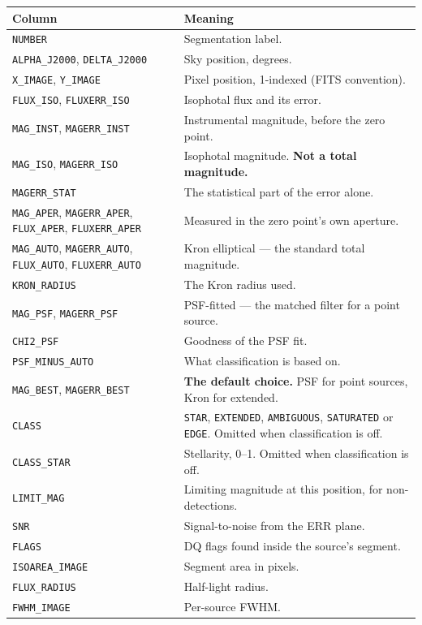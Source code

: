 \documentclass[11pt,a4paper]{article}
\begin{document}
\begin{center}
\begin{longtable}{|p{4.4cm}|p{10.1cm}|}
\hline
\textbf{Column} & \textbf{Meaning} \\
\hline
\endhead
\texttt{NUMBER} & Segmentation label. \\
\hline
\texttt{ALPHA\_J2000}, \texttt{DELTA\_J2000} & Sky position, degrees. \\
\hline
\texttt{X\_IMAGE}, \texttt{Y\_IMAGE} & Pixel position, 1-indexed (FITS convention). \\
\hline
\texttt{FLUX\_ISO}, \texttt{FLUXERR\_ISO} & Isophotal flux and its error. \\
\hline
\texttt{MAG\_INST}, \texttt{MAGERR\_INST} & Instrumental magnitude, before the zero point. \\
\hline
\texttt{MAG\_ISO}, \texttt{MAGERR\_ISO} & Isophotal magnitude. \textbf{Not a total magnitude.} \\
\hline
\texttt{MAGERR\_STAT} & The statistical part of the error alone. \\
\hline
\texttt{MAG\_APER}, \texttt{MAGERR\_APER}, \texttt{FLUX\_APER}, \texttt{FLUXERR\_APER} & Measured in the zero point's own aperture. \\
\hline
\texttt{MAG\_AUTO}, \texttt{MAGERR\_AUTO}, \texttt{FLUX\_AUTO}, \texttt{FLUXERR\_AUTO} & Kron elliptical --- the standard total magnitude. \\
\hline
\texttt{KRON\_RADIUS} & The Kron radius used. \\
\hline
\texttt{MAG\_PSF}, \texttt{MAGERR\_PSF} & PSF-fitted --- the matched filter for a point source. \\
\hline
\texttt{CHI2\_PSF} & Goodness of the PSF fit. \\
\hline
\texttt{PSF\_MINUS\_AUTO} & What classification is based on. \\
\hline
\texttt{MAG\_BEST}, \texttt{MAGERR\_BEST} & \textbf{The default choice.} PSF for point sources, Kron for extended. \\
\hline
\texttt{CLASS} & \texttt{STAR}, \texttt{EXTENDED}, \texttt{AMBIGUOUS}, \texttt{SATURATED} or \texttt{EDGE}. Omitted when classification is off. \\
\hline
\texttt{CLASS\_STAR} & Stellarity, 0--1. Omitted when classification is off. \\
\hline
\texttt{LIMIT\_MAG} & Limiting magnitude at this position, for non-detections. \\
\hline
\texttt{SNR} & Signal-to-noise from the ERR plane. \\
\hline
\texttt{FLAGS} & DQ flags found inside the source's segment. \\
\hline
\texttt{ISOAREA\_IMAGE} & Segment area in pixels. \\
\hline
\texttt{FLUX\_RADIUS} & Half-light radius. \\
\hline
\texttt{FWHM\_IMAGE} & Per-source FWHM. \\
\hline
\end{longtable}
\end{center}
\end{document}
